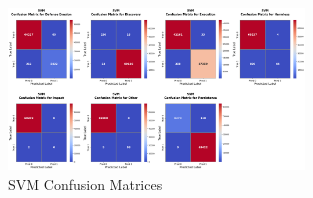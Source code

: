         \clearpage
    
        
        \begin{figure}[H]
        
            \centering
            
            \begin{minipage}{\textwidth}
                \centering
                \begin{minipage}[c]{\textwidth}
                    \centering
                    \includegraphics[width=0.7\textwidth]{../figures/plots/section2/SVM_confusion_matrices.png}
                    \caption{SVM Confusion Matrices}
                    \label{fig:}
                \end{minipage}%
            \end{minipage}

            \vspace{0.5cm}  %
            

\end{figure}
